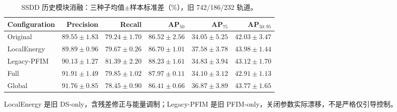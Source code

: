 \begin{table}[tp]
\centering\small
\setlength{\tabcolsep}{4pt}
\caption{SSDD 历史模块消融：三种子均值$\pm$样本标准差（\%），旧 742/186/232 轨道。}\label{tab:component_ablation}
\begin{tabular*}{\textwidth}{@{\extracolsep{\fill}}lrrrrr}
\toprule
Configuration & Precision & Recall & AP$_{50}$ & AP$_{75}$ & AP$_{50:95}$\\
\midrule
Original & $89.55\pm1.83$ & $79.24\pm1.70$ & $86.52\pm2.56$ & $34.05\pm5.25$ & $42.03\pm3.47$ \\
LocalEnergy & $89.89\pm0.96$ & $79.67\pm0.26$ & $86.70\pm1.01$ & $37.58\pm3.78$ & $43.98\pm1.44$ \\
Legacy-PFIM & $90.13\pm1.27$ & $81.39\pm2.20$ & $88.23\pm1.61$ & $34.83\pm3.94$ & $43.12\pm1.70$ \\
Full & $91.91\pm1.49$ & $79.85\pm1.02$ & $87.97\pm0.11$ & $34.10\pm3.12$ & $42.91\pm1.13$ \\
Global & $91.76\pm0.85$ & $78.45\pm0.90$ & $86.41\pm0.66$ & $36.87\pm3.89$ & $43.77\pm1.65$ \\
\bottomrule
\end{tabular*}
\smallskip
\begin{minipage}{\linewidth}\footnotesize
LocalEnergy 是旧 DS-only，含残差修正与能量调制；Legacy-PFIM 是旧 PFIM-only，关闭参数实际漂移，不是严格仅引导控制。
\end{minipage}
\end{table}
